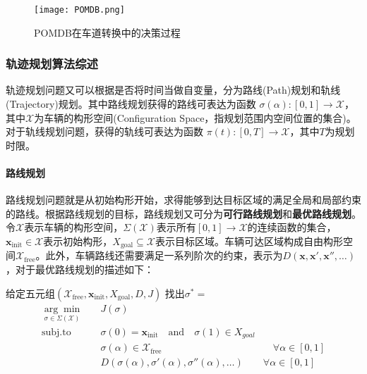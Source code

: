       \begin{figure}[htbp]
      \centering
      \texttt{[image: POMDB.png]}
      \caption{POMDB在车道转换中的决策过程\cite{Ulbrich2013Probabilistic}}
      \label{fig:POMDB}
      \end{figure}

    \subsubsection{轨迹规划算法综述}
    \label{sec:trajectory}
      轨迹规划问题又可以根据是否将时间当做自变量，分为路线(Path)规划和轨线(Trajectory)规划。其中路线规划获得的路线可表达为函数 $\sigma(\alpha): [0,1]\rightarrow \mathcal{X}$，其中$\mathcal{X}$为车辆的构形空间(Configuration Space，指规划范围内空间位置的集合)。对于轨线规划问题，获得的轨线可表达为函数 $\pi(t): [0, T]\rightarrow \mathcal{X}$，其中$T$为规划时限。

      \paragraph{路线规划} 路线规划问题就是从初始构形开始，求得能够到达目标区域的满足全局和局部约束的路线。根据路线规划的目标，路线规划又可分为\textbf{可行路线规划}和\textbf{最优路线规划}。令$\mathcal{X}$表示车辆的构形空间，$\Sigma(\mathcal{X})$表示所有$[0,1]\rightarrow \mathcal{X}$的连续函数的集合，$\mathbf{x}_{\mathrm{init}}\in \mathcal{X}$表示初始构形，$X_{\mathrm{goal}}\subseteq \mathcal{X}$表示目标区域。车辆可达区域构成自由构形空间$\mathcal{X}_{\mathrm{free}}$。此外，车辆路线还需要满足一系列阶次的约束，表示为$D(\mathbf{x},\mathbf{x}',\mathbf{x}'', \dots)$，对于最优路线规划的描述如下：

      \begin{definition}[最优路线规划]
      \label{def:path}
      给定五元组$(\mathcal{X}_{\mathrm{free}}, \mathbf{x}_{\mathrm{init}}, X_{\mathrm{goal}}, D, J)$ 找出$\sigma^*=$
      \begin{equation}
      \begin{aligned}
      \underset{\sigma\in \Sigma(\mathcal{X})}{\arg\min}\quad & J(\sigma) & \\
      \mathrm{subj. to} \quad & \sigma(0)=\mathbf{x}_{\mathrm{init}} \quad \mathrm{and} \quad \sigma(1)\in X_{goal} & \\
      \quad & \sigma(\alpha)\in \mathcal{X}_{\mathrm{free}} & \quad \forall \alpha\in [0,1]\\
      & D(\sigma(\alpha),\sigma'(\alpha),\sigma''(\alpha), \dots) & \forall \alpha\in [0,1]
      \end{aligned}
      \end{equation}
      \end{definition}

